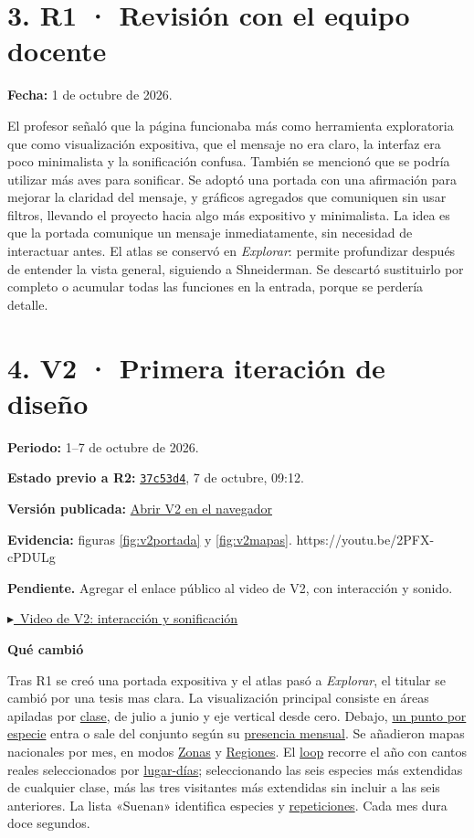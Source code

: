 \documentclass[11pt,a4paper]{article}
\newcommand{\VideoVDos}{https://youtu.be/2PFX-cPDULg}
\newcommand{\Repo}{https://github.com/canija2000/infovis_2026-2}
\newcommand{\Sitio}{https://canija2000.github.io/infovis_2026-2/}
\newcommand{\falta}[1]{\par{\small\color{pendiente}\textbf{Pendiente.} #1}\par}
\newcommand{\campo}[1]{\par\needspace{3\baselineskip}\textbf{#1}\par\nopagebreak}
\newcommand{\commit}[2]{\href{\Repo/commit/#1}{\texttt{#2}}}
\newcommand{\versionweb}[1]{\par\textbf{Versión publicada:} \href{\Sitio v#1/}{\textcolor{acento}{Abrir V#1 en el navegador}}\quad{\small\texttt{/v#1/}}\par}
\newcommand{\video}[2]{\begingroup\edef\videourl{#1}\ifx\videourl\empty
  \falta{Agregar el enlace público al video #2, con interacción y sonido.}
  \else\par\href{#1}{\textcolor{acento}{$\blacktriangleright$\ \underline{Video #2: interacción y sonificación}}}\quad{\small\url{#1}}\par\fi\endgroup}
\newcommand{\seccion}[1]{\clearpage\section*{#1}}
\DeclareRobustCommand{\concepto}[2]{\hyperlink{concepto:#1}{\textcolor{acento}{#2}}}
\begin{document}
\section*{3. R1 · Revisión con el equipo docente}
\textbf{Fecha:} 1 de octubre de 2026.\par
El profesor señaló que la página funcionaba más como herramienta exploratoria que como visualización expositiva, que el mensaje no era claro, la interfaz era poco minimalista y la sonificación confusa. También se mencionó que se podría utilizar más aves para sonificar. Se adoptó una portada con una afirmación para mejorar la claridad del mensaje, y gráficos agregados que comuniquen sin usar filtros, llevando el proyecto hacia algo más expositivo y minimalista. La idea es que la portada comunique un mensaje inmediatamente, sin necesidad de interactuar antes. El atlas se conservó en \textit{Explorar}: permite profundizar después de entender la vista general, siguiendo a Shneiderman. Se descartó sustituirlo por completo o acumular todas las funciones en la entrada, porque se perdería detalle.

\seccion{4. V2 · Primera iteración de diseño}
\textbf{Periodo:} 1--7 de octubre de 2026.\par
\textbf{Estado previo a R2:} \commit{37c53d46ba8e928de165d5cb40f1206b5231a618}{37c53d4}, 7 de octubre, 09:12.\par
\versionweb{2}
\textbf{Evidencia:} figuras \ref{fig:v2portada} y \ref{fig:v2mapas}.
\video{\VideoVDos}{de V2}

\campo{Qué cambió}
Tras R1 se creó una portada expositiva y el atlas pasó a \textit{Explorar}, el titular se cambió por una tesis mas clara. La visualización principal consiste en áreas apiladas por \concepto{clases}{clase}, de julio a junio y eje vertical desde cero. Debajo, \concepto{unidad-visual}{un punto por especie} entra o sale del conjunto según su \concepto{presente}{presencia mensual}. Se añadieron mapas nacionales por mes, en modos \concepto{ola-zonas}{Zonas} y \concepto{ola-regiones}{Regiones}. El \concepto{tiempo-sonoro}{loop} recorre el año con cantos reales seleccionados por \concepto{lugar-dias}{lugar-días}; seleccionando las seis especies más extendidas de cualquier clase, más las tres visitantes más extendidas sin incluir a las seis anteriores. La lista «Suenan» identifica especies y \concepto{copias}{repeticiones}. Cada mes dura doce segundos.
\end{document}
